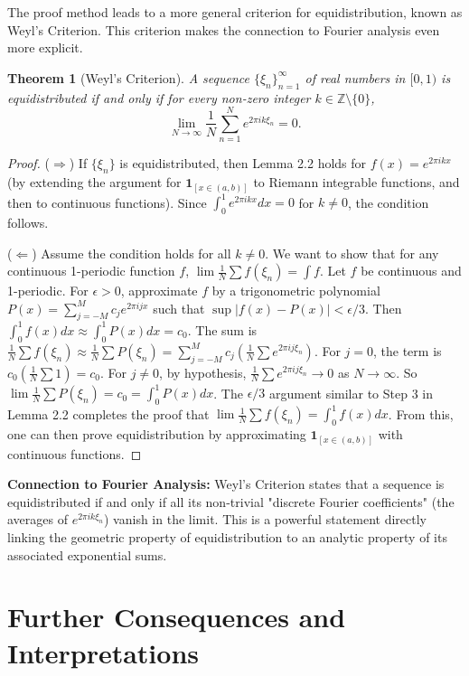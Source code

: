 \documentclass[12pt]{article}
\newtheorem{theorem}{Theorem}[section]
\newcommand{\Z}{\mathbb{Z}}
\begin{document}
The proof method leads to a more general criterion for equidistribution, known as Weyl's Criterion. This criterion makes the connection to Fourier analysis even more explicit.

\begin{theorem}[Weyl's Criterion]
A sequence $\{\xi_n\}_{n=1}^\infty$ of real numbers in $[0,1)$ is equidistributed if and only if for every non-zero integer $k \in \Z \setminus \{0\}$,
$$ \lim_{N\to\infty} \frac{1}{N} \sum_{n=1}^N e^{2\pi i k \xi_n} = 0. $$
\end{theorem}
\begin{proof}
($\Rightarrow$) If $\{\xi_n\}$ is equidistributed, then Lemma 2.2 holds for $f(x) = e^{2\pi i k x}$ (by extending the argument for $\mathbf{1}_{[x \in (a,b)]}$ to Riemann integrable functions, and then to continuous functions). Since $\int_0^1 e^{2\pi i k x} dx = 0$ for $k \neq 0$, the condition follows.

($\Leftarrow$) Assume the condition holds for all $k \neq 0$. We want to show that for any continuous 1-periodic function $f$, $\lim \frac{1}{N}\sum f(\xi_n) = \int f$.
Let $f$ be continuous and 1-periodic. For $\epsilon > 0$, approximate $f$ by a trigonometric polynomial $P(x) = \sum_{j=-M}^M c_j e^{2\pi i j x}$ such that $\sup|f(x)-P(x)| < \epsilon/3$.
Then $\int_0^1 f(x) dx \approx \int_0^1 P(x) dx = c_0$.
The sum is $\frac{1}{N}\sum f(\xi_n) \approx \frac{1}{N}\sum P(\xi_n) = \sum_{j=-M}^M c_j \left(\frac{1}{N}\sum e^{2\pi i j \xi_n}\right)$.
For $j=0$, the term is $c_0 \left(\frac{1}{N}\sum 1\right) = c_0$.
For $j \neq 0$, by hypothesis, $\frac{1}{N}\sum e^{2\pi i j \xi_n} \to 0$ as $N \to \infty$.
So $\lim \frac{1}{N}\sum P(\xi_n) = c_0 = \int_0^1 P(x) dx$.
The $\epsilon/3$ argument similar to Step 3 in Lemma 2.2 completes the proof that $\lim \frac{1}{N}\sum f(\xi_n) = \int_0^1 f(x) dx$.
From this, one can then prove equidistribution by approximating $\mathbf{1}_{[x \in (a,b)]}$ with continuous functions.
\end{proof}

\textbf{Connection to Fourier Analysis:} Weyl's Criterion states that a sequence is equidistributed if and only if all its non-trivial "discrete Fourier coefficients" (the averages of $e^{2\pi i k \xi_n}$) vanish in the limit. This is a powerful statement directly linking the geometric property of equidistribution to an analytic property of its associated exponential sums.

\section{Further Consequences and Interpretations}
\end{document}
